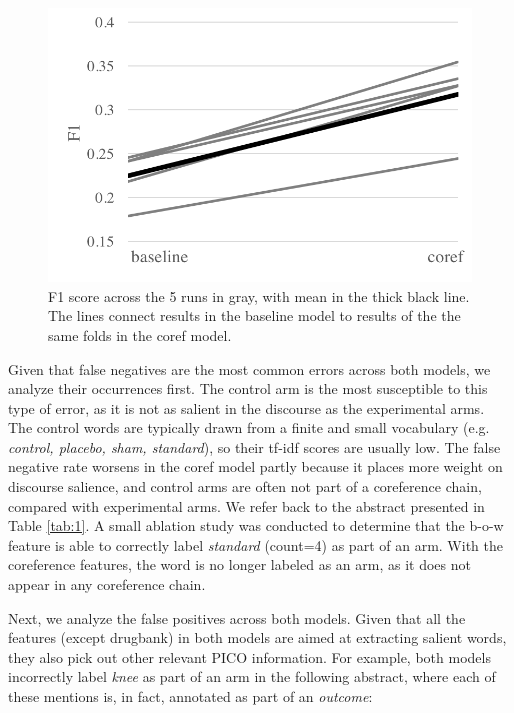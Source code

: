 \begin{figure}[t]
\centering
\includegraphics[scale=0.5]{plots/longer1_f1_variance.png}
\vspace{-0.5em}
\caption{F1 score across the 5 runs in gray, with mean in the thick black line. The lines connect results in the baseline model to results of the the same folds in the coref model.}
\label{fig:f1}
\vspace{-.5em}
\end{figure}

Given that false negatives are the most common errors across both models, we analyze their occurrences first. The control arm is the most susceptible to this type of error, as it is not as salient in the discourse as the experimental arms. The control words are typically drawn from a finite and small vocabulary (e.g. \textit{control, placebo, sham, standard}), so their tf-idf scores are usually low. The false negative rate worsens in the coref model partly because it places more weight on discourse salience, and control arms are often not part of a coreference chain, compared with experimental arms. We refer back to the abstract presented in Table \ref{tab:1}. A small ablation study was conducted to determine that the b-o-w feature is able to correctly label \textit{standard} (count=4) as part of an arm. With the coreference features, the word is no longer labeled as an arm, as it does not appear in any coreference chain.

Next, we analyze the false positives across both models. Given that all the features (except drugbank) in both models are aimed at extracting salient words, they also pick out other relevant PICO information. For example, both models incorrectly label \textit{knee} as part of an arm in the following abstract, where each of these mentions is, in fact, annotated as part of an \textit{outcome}:

